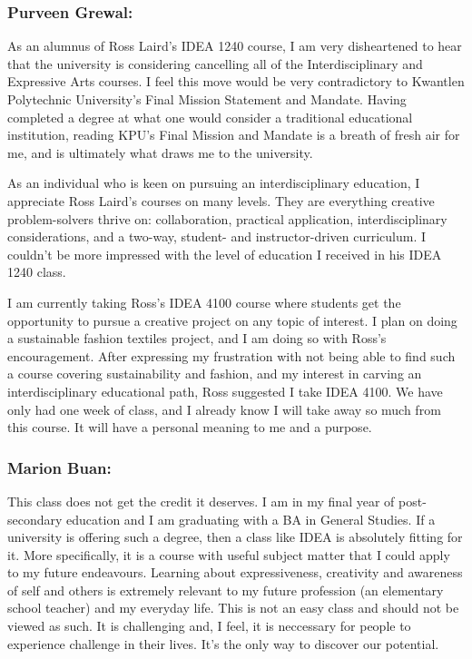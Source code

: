 \documentclass[letterpaper,10pt,headsepline]{scrreprt}
\begin{document}
\subsubsection{Purveen Grewal:}

As an alumnus of Ross Laird’s IDEA 1240 course, I am very disheartened to hear that the university is considering cancelling all of the Interdisciplinary and Expressive Arts courses. I feel this move would be very contradictory to Kwantlen Polytechnic University’s Final Mission Statement and Mandate. Having completed a degree at what one would consider a traditional educational institution, reading KPU’s Final Mission and Mandate is a breath of fresh air for me, and is ultimately what draws me to the university.

As an individual who is keen on pursuing an interdisciplinary education, I appreciate Ross Laird’s courses on many levels. They are everything creative problem-solvers thrive on: collaboration, practical application, interdisciplinary considerations, and a two-way, student- and instructor-driven curriculum. I couldn’t be more impressed with the level of education I received in his IDEA 1240 class. 

I am currently taking Ross’s IDEA 4100 course where students get the opportunity to pursue a creative project on any topic of interest. I plan on doing a sustainable fashion textiles project, and I am doing so with Ross’s encouragement. After expressing my frustration with not being able to find such a course covering sustainability and fashion, and my interest in carving an interdisciplinary educational path, Ross suggested I take IDEA 4100. We have only had one week of class, and I already know I will take away so much from this course. It will have a personal meaning to me and a purpose. 

\subsubsection{Marion Buan:}

This class does not get the credit it deserves. I am in my final year of post-secondary education and I am graduating with a BA in General Studies. If a university is offering such a degree, then a class like IDEA is absolutely fitting for it. More specifically, it is a course with useful subject matter that I could apply to my future endeavours. Learning about expressiveness, creativity and awareness of self and others is extremely relevant to my future profession (an elementary school teacher) and my everyday life. This is not an easy class and should not be viewed as such. It is challenging and, I feel, it is neccessary for people to experience challenge in their lives. It's the only way to discover our potential.
\end{document}
